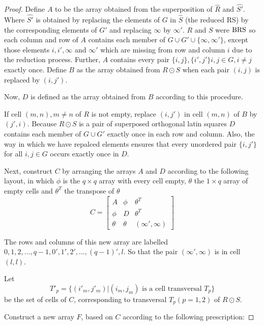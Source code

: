 \begin{proof}
Define $A$ to be the array obtained from the superposition of $\hat{R}$ and $\hat{S'}$.
Where $\hat{S'}$ is obtained by replacing the elements of $G$ in $\hat{S}$ (the reduced RS) by the corresponding elements of $G'$ and replacing $\infty$ by $\infty'$.
$R$ and $S$ were $\operatorname{BRS}$ so each column and row of $A$ contains each member of $G \cup G' \cup \{\infty, \infty'\}$, except those elements $i,i',\infty$ and $\infty'$ which are missing from row and column $i$ due to the reduction process.
Further, $A$ contains every pair $\{i,j\},\{i',j'\} i,j \in G,i \neq j$ exactly once.
Define $B$ as the array obtained from $R \odot S$ when each pair $(i,j)$ is replaced by $(i, j')$.

Now, $D$ is defined as the array obtained from $B$ according to this procedure.

If cell $(m, n), m\neq n$ of $R$ is not empty, replace $(i, j')$ in cell $(m, n)$ of $B$ by $(j', i)$.
Because $R \odot S$ is a pair of superposed orthogonal latin squares $D$ contains each member of $G \cup G'$ exactly once in each row and column.
Also, the way in which we have repalced elements ensures that every unordered pair $\{i, j'\}$ for all $i, j \in G$ occurs exactly once in $D$.

Next, construct $C$ by arranging the arrays $A$ and $D$ according to the following layout, in which $\phi$ is the $q \times q$ array with every cell empty, $\theta$ the $1 \times q$ array of empty cells and $\theta ^T$ the transpose of $\theta$
\begin{equation}
  C =
  \begin{bmatrix}
    A & \phi & \theta^T \\
    \phi & D & \theta^T \\
    \theta & \theta & (\infty',\infty)
  \end{bmatrix}
\end{equation}

The rows and columns of this new array are labelled $0, 1, 2, \ldots, q - 1, 0', 1', 2', \ldots, (q - 1)',l$.
So that the pair $(\infty ', \infty)$ is in cell $(l, l)$.

Let
\begin{equation}
 T'_p = \{ (i'_m,j'_m) | (i_m,j_m) \text{ is a cell transversal } T_p \}
\end{equation}
be the set of cells of $C$, corresponding to transversal
$T_p (p=1,2)$ of $R \odot S$.

Construct a new array $F$, based on $C$ according to the following prescription:


\end{proof}
